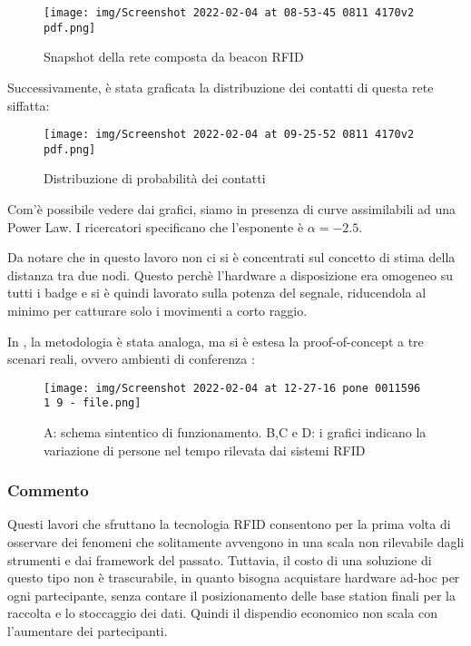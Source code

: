 \documentclass[12pt,twoside]{report}
\begin{document}
    \begin{figure}[h]
	    \centering
	    \texttt{[image: img/Screenshot 2022-02-04 at 08-53-45 0811 4170v2 pdf.png]}
	    \caption{Snapshot della rete composta da beacon RFID}
	    \label{fig:my_label}
	\end{figure}
	\FloatBarrier
    
    Successivamente, è stata graficata la distribuzione dei contatti di questa rete siffatta:
    
    \begin{figure}[h]
	    \centering
	    \texttt{[image: img/Screenshot 2022-02-04 at 09-25-52 0811 4170v2 pdf.png]}
	    \caption{Distribuzione di probabilità dei contatti}
	    \label{fig:my_label}
	\end{figure}
	
	\FloatBarrier
	
	Com'è possibile vedere dai grafici, siamo in presenza di curve assimilabili ad una Power Law. I ricercatori specificano che l'esponente è $\alpha = -2.5$.
	
	Da notare che in questo lavoro non ci si è concentrati sul concetto di stima della distanza tra due nodi. Questo perchè l'hardware a disposizione era omogeneo su tutti i badge e si è quindi lavorato sulla potenza del segnale, riducendola al minimo per catturare solo i movimenti a corto raggio.
	
	In \cite{10.1371/journal.pone.0011596}, la metodologia è stata analoga, ma si è estesa la proof-of-concept a tre scenari reali, ovvero ambienti di conferenza : 
	
	\begin{figure}[h]
	    \centering
	    \texttt{[image: img/Screenshot 2022-02-04 at 12-27-16 pone 0011596 1 9 - file.png]}
	    \centering
	    \caption{A: schema sintentico di funzionamento. B,C e D: i grafici indicano la variazione di persone nel tempo rilevata dai sistemi RFID}
	    \label{fig:my_label}
	\end{figure}
    
    \subsubsection{Commento}
    
    Questi lavori che sfruttano la tecnologia RFID consentono per la prima volta di osservare dei fenomeni che solitamente avvengono in una scala non rilevabile dagli strumenti e dai framework del passato. Tuttavia, il costo di una soluzione di questo tipo non è trascurabile, in quanto bisogna acquistare hardware ad-hoc per ogni partecipante, senza contare il posizionamento delle base station finali per la raccolta e lo stoccaggio dei dati. Quindi il dispendio economico non scala con l'aumentare dei partecipanti.
    
\end{document}
